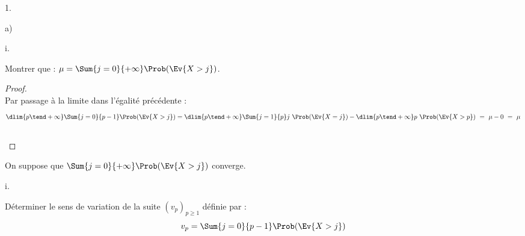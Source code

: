 \documentclass[11pt]{article}%
\begin{document}
\begin{noliste}{1.}
\begin{noliste}{a)}
\begin{nonoliste}{i.}
    \newpage


  \item Montrer que : $\mu= \Sum{j=0}{+\infty} \Prob(\Ev{X >j})$.

      \begin{proof}~\\
        Par passage à la limite dans l'égalité précédente :
        \[
        \dlim{p \tend +\infty} \Sum{j=0}{p-1} \Prob(\Ev{X > j}) =
        \dlim{p \tend +\infty} \Sum{j=1}{p} j \ \Prob(\Ev{X = j}) -
        \dlim{p \tend +\infty} p \ \Prob(\Ev{X > p}) \ = \ \mu - 0 \ =
        \ \mu
        \]
        ~\\[-1cm] 
      \end{proof}
    \end{nonoliste}
    
  \item On suppose que $\Sum{j=0}{+\infty} \Prob(\Ev{X >j})$ converge.
    \begin{nonoliste}{i.}
    \item Déterminer le sens de variation de la suite $(v_p)_{p \geq
        1}$ définie par :
      \[
      v_p= \Sum{j=0}{p-1} \Prob(\Ev{X >j})
      \]
      

\end{nonoliste}
\end{noliste}
\end{noliste}
\end{document}
